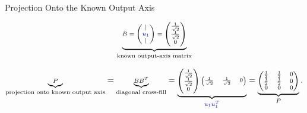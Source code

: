 \documentclass[10pt]{beamer}
\theoremstyle{definition}
\newcommand{\bl}[1]{{\color{blue!70!black}#1}}
\begin{document}
\begin{frame}[shrink=10]{Projection Onto the Known Output Axis}

\[
\scriptsize
\underbrace{
B=
\begin{pmatrix}
|\\
\bl{u_1}\\
|
\end{pmatrix}
=
\begin{pmatrix}
\frac1{\sqrt2}\\[0.15em]
\frac1{\sqrt2}\\[0.15em]
0
\end{pmatrix}}_{\text{known output-axis matrix}}
\]

\vfill

\[
\scriptsize
\underbrace{P}_{\text{projection onto known output axis}}
=
\underbrace{BB^T}_{\text{diagonal cross-fill}}
=
\underbrace{
\begin{pmatrix}
\frac1{\sqrt2}\\[0.15em]
\frac1{\sqrt2}\\[0.15em]
0
\end{pmatrix}
\begin{pmatrix}
\frac1{\sqrt2}&\frac1{\sqrt2}&0
\end{pmatrix}}_{\bl{u_1u_1^T}}
=
\underbrace{
\begin{pmatrix}
\frac12&\frac12&0\\
\frac12&\frac12&0\\
0&0&0
\end{pmatrix}}_{P}.
\]

\end{frame}
\end{document}
